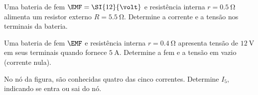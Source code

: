 \blocoaplicacao
\begin{questao}[2]{}

Uma bateria de fem $\EMF = \SI{12}{\volt}$ e resistência interna
$r = \SI{0.5}{\ohm}$ alimenta um resistor externo $R = \SI{5.5}{\ohm}$. Determine
a corrente e a tensão nos terminais da bateria.


\end{questao}
\begin{questao}[2]{}

Uma bateria de fem $\EMF$ e resistência interna $r = \SI{0.4}{\ohm}$ apresenta
tensão de $\SI{12}{\volt}$ em seus terminais quando fornece
$\SI{5}{\ampere}$. Determine a fem e a tensão em vazio (corrente nula).


\end{questao}
\begin{questao}[2]{}

No nó da figura, são conhecidas quatro das cinco correntes. Determine $I_5$,
indicando se entra ou sai do nó.




\end{questao}

